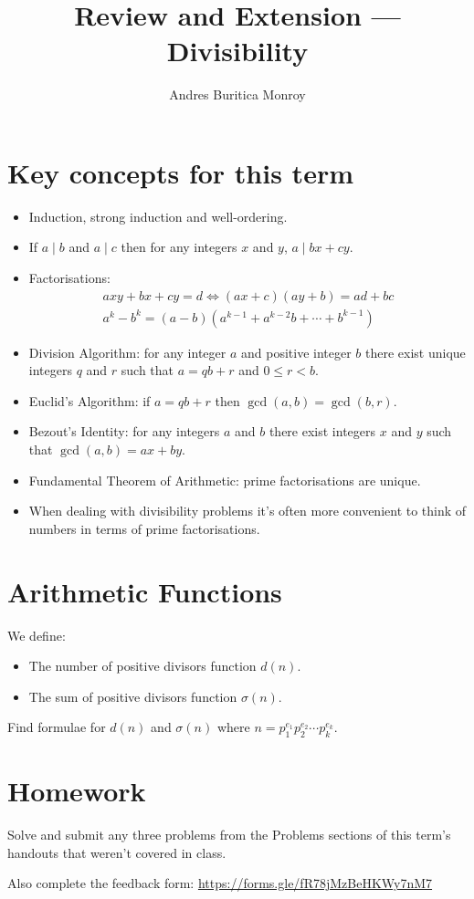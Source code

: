 \documentclass{article}
\title{Review and Extension --- Divisibility}
\author{Andres Buritica Monroy}
\date{}
\begin{document}
\maketitle
\section{Key concepts for this term}
\begin{itemize}
	\item Induction, strong induction and well-ordering.
	\item If $a\mid b$ and $a\mid c$ then for any integers $x$ and $y$, $a\mid
		      bx+cy$.
	\item Factorisations:
	      \begin{align*}
		      axy+bx+cy=d\iff (ax+c)(ay+b)=ad+bc \\
		      a^k-b^k=(a-b)\left(a^{k-1}+a^{k-2}b+\cdots+b^{k-1}\right)
	      \end{align*}
	\item Division Algorithm: for any integer $a$ and positive integer $b$ there
	      exist unique integers $q$ and $r$ such that $a=qb+r$ and $0\le r<b$.
	\item Euclid's Algorithm: if $a=qb+r$ then $\gcd(a,b)=\gcd(b,r)$.
	\item Bezout's Identity: for any integers $a$ and $b$ there exist integers
	      $x$ and $y$ such that $\gcd(a,b)=ax+by$.
	\item Fundamental Theorem of Arithmetic: prime factorisations are unique.
	\item When dealing with divisibility problems it's often more convenient to
	      think of numbers in terms of prime factorisations.
\end{itemize}
\section{Arithmetic Functions}
We define:
\begin{itemize}
	\item The number of positive divisors function $d(n)$.
	\item The sum of positive divisors function $\sigma(n)$.
\end{itemize}
Find formulae for $d(n)$ and $\sigma(n)$ where
$n=p_1^{e_1}p_2^{e_2}\cdots p_k^{e_k}$.
\section{Homework}
Solve and submit any three problems from the Problems sections of this
term's handouts that weren't covered in class.

Also complete the feedback form:
\url{https://forms.gle/fR78jMzBeHKWy7nM7}
\end{document}
